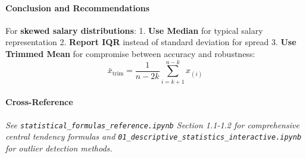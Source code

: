 \documentclass[11pt]{article}
\begin{document}
\paragraph{Conclusion and
Recommendations}\label{conclusion-and-recommendations}

For \textbf{skewed salary distributions}: 1. \textbf{Use Median} for
typical salary representation 2. \textbf{Report IQR} instead of standard
deviation for spread 3. \textbf{Use Trimmed Mean} for compromise between
accuracy and robustness:
\[\bar{x}_{\text{trim}} = \frac{1}{n-2k}\sum_{i=k+1}^{n-k} x_{(i)}\]

\paragraph{Cross-Reference}\label{cross-reference}

\emph{See \texttt{statistical\_formulas\_reference.ipynb} Section
1.1-1.2 for comprehensive central tendency formulas and
\texttt{01\_descriptive\_statistics\_interactive.ipynb} for outlier
detection methods.}
\end{document}
